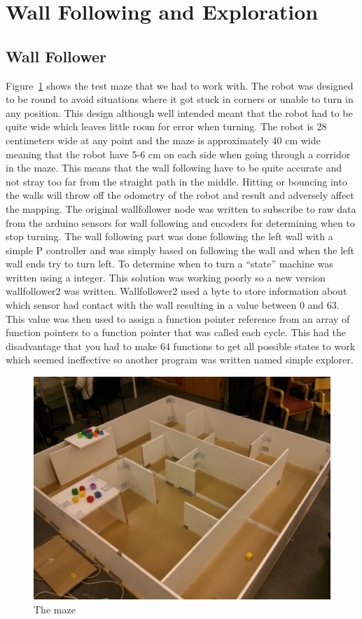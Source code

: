 \documentclass[10pt,a4paper,twocolumn]{article}
\begin{document}
\section{Wall Following and Exploration}
\subsection{Wall Follower}
\label{sec:wall}
Figure~\ref{fig:maze} shows the test maze that we had to work with. The robot
was designed to be round to avoid situations where it got stuck in corners or
unable to turn in any position. This design although well intended meant that
the robot had to be quite wide which leaves little room for error when turning.
The robot is 28 centimeters wide at any point and the maze is approximately 40
cm wide meaning that the robot have 5-6 cm on each side when going through a
corridor in the maze. This means that the wall following have to be quite
accurate and not stray too far from the straight path in the middle. Hitting or
bouncing into the walls will throw off the odometry of the robot and result and
adversely affect the mapping. The original wallfollower node was written to
subscribe to raw data from the arduino sensors for wall following and encoders
for determining when to stop turning. The wall following part was done following
the left wall with a simple P controller and was simply based on following the
wall and when the left wall ends try to turn left. To determine when to turn a
“state” machine was written using a integer. This solution was working poorly so
a new version wallfollower2 was written. Wallfollower2 used a byte to store
information about which sensor had contact with the wall resulting in a value
between 0 and 63. This value was then used to assign a function pointer
reference from an array of function pointers to a function pointer that was
called each cycle. This had the disadvantage that you had to make 64 functions
to get all possible states to work which seemed ineffective so another program
was written named simple explorer.

\begin{figure}
  \centering
  \includegraphics[width=\linewidth]{images/maze.jpg}
  \caption{The maze}
  \label{fig:maze}
\end{figure}
\end{document}
